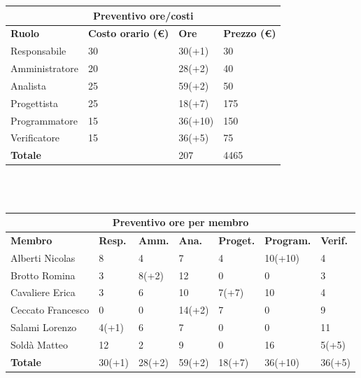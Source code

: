 \documentclass[a4paper, 12pt]{article}
\begin{document}
\begin{center}
	\begin{tabularx}{\textwidth}{|X|X|X|X|}
		\hline
		\multicolumn{4}{|c|}{\textbf{Preventivo ore/costi}}                                      \\
		\hline
		\hline
		\textbf{Ruolo}  & \textbf{Costo orario (\euro)} & \textbf{Ore} & \textbf{Prezzo (\euro)} \\
		\hline
		Responsabile    & 30                            & 30(+1)       & 30                     \\
		\hline
		Amministratore  & 20                            & 28(+2)       & 40                      \\
		\hline
		Analista        & 25                            & 59(+2)       & 50                       \\
		\hline
		Progettista     & 25                            & 18(+7)       & 175                      \\
		\hline
		Programmatore   & 15                            & 36(+10)       & 150                      \\
		\hline
		Verificatore    & 15                            & 36(+5)       & 75                      \\
		\hline
		\hline
		\textbf{Totale} &                               & 207          & 4465                   \\
		\hline
	\end{tabularx}\\[8pt]
	\mbox{}\\
\end{center}

\begin{center}
	\begin{tabularx}{\textwidth}{|X|X|X|X|X|X|X|}
		\hline
		\multicolumn{7}{|c|}{\textbf{Preventivo ore per membro}}                                      \\
		\hline
		\hline
		\textbf{Membro}  & \textbf{Resp.} & \textbf{Amm.} & \textbf{Ana.} &
		\textbf{Proget.} & \textbf{Program.} & \textbf{Verif.} \\
		\hline
		Alberti Nicolas    	&8 	&4	&7	&4	&10(+10) &4	\\
		\hline
		Brotto Romina    	&3 	&8(+2)	&12	&0	&0	&3	\\
		\hline
		Cavaliere Erica    	&3 	&6  &10  &7(+7) &10 &4	\\
		\hline
		Ceccato Francesco   &0 	&0  &14(+2) &7 &0 &9	\\
		\hline
		Salami Lorenzo    	&4(+1) 	&6  &7 &0 &0 &11	\\
		\hline
		Soldà Matteo    	&12	&2  &9 &0 &16 &5(+5)	\\
		\hline
		\hline
		\textbf{Totale} 	&30(+1) &28(+2) &59(+2) &18(+7) &36(+10) &36(+5)	\\
		\hline
	\end{tabularx}\\[8pt]
	\mbox{}\\
\end{center}
\end{document}
